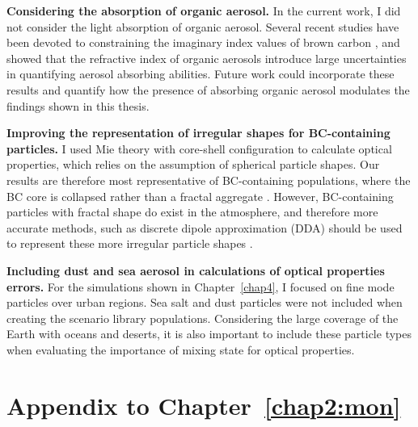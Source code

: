 \documentclass[edeposit,fullpage]{uiucthesis2009}
\begin{document}
{\bf Considering the absorption of organic aerosol.} In the current
work, I did not consider the light absorption of organic
aerosol. Several recent studies have been devoted to constraining the
imaginary index values of brown carbon \citep{liu2020lifecycle}, and
\citet{Esteve2014} showed that the refractive index of organic
aerosols introduce large uncertainties in quantifying aerosol
absorbing abilities. Future work could incorporate these results and
quantify how the presence of absorbing organic aerosol modulates the
findings shown in this thesis.

{\bf Improving the representation of irregular shapes for
  BC-containing particles.}  I used Mie theory with core-shell
configuration to calculate optical properties, which relies on the
assumption of spherical particle shapes. Our results are therefore
most representative of BC-containing populations, where the BC core is
collapsed rather than a fractal aggregate \citep{china2013morphology,
  china2015morphology}. However, BC-containing particles with fractal
shape do exist in the atmosphere, and therefore more accurate methods,
such as discrete dipole approximation (DDA) should be used to
represent these more irregular particle shapes
\citep{scarnato2013effects,curtis2008laboratory,luo2019optical,
  wu2020light}.

{\bf Including dust and sea aerosol in calculations of optical
  properties errors.} For the simulations shown in Chapter~\ref{chap4}, I
focused on fine mode particles over urban regions. Sea salt and dust
particles were not included when creating the scenario library
populations. Considering the large coverage of the Earth with oceans
and deserts, it is also important to include these particle types when
evaluating the importance of mixing state for optical properties.

\appendix
\setcounter{algorithm}{0}

\chapter{Appendix to Chapter~\ref{chap2:mon}}
\label{tab:capram}
\end{document}
